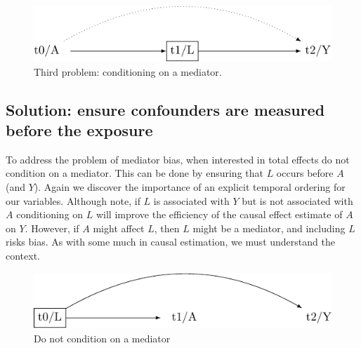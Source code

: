 \documentclass[
  singlecolumn]{report}
\begin{document}
\begin{figure}

{\centering \includegraphics[width=1\textwidth,height=\textheight]{causal-dags_files/figure-pdf/fig-dag-mediator-1.pdf}

}

\caption{\label{fig-dag-mediator}Third problem: conditioning on a
mediator.}

\end{figure}

\hypertarget{solution-ensure-confounders-are-measured-before-the-exposure}{%
\subsection{Solution: ensure confounders are measured before the
exposure}\label{solution-ensure-confounders-are-measured-before-the-exposure}}

To address the problem of mediator bias, when interested in total
effects do not condition on a mediator. This can be done by ensuring
that \(L\) occurs before \(A\) (and \(Y\)). Again we discover the
importance of an explicit temporal ordering for our variables. Although
note, if \(L\) is associated with \(Y\) but is not associated with \(A\)
conditioning on \(L\) will improve the efficiency of the causal effect
estimate of \(A\) on \(Y\). However, if \(A\) might affect \(L\), then
\(L\) might be a mediator, and including \(L\) risks bias. As with some
much in causal estimation, we must understand the context.

\begin{figure}

{\centering \includegraphics[width=1\textwidth,height=\textheight]{causal-dags_files/figure-pdf/fig-dag-mediator-solution-1.pdf}

}

\caption{\label{fig-dag-mediator-solution}Do not condition on a
mediator}

\end{figure}
\end{document}
